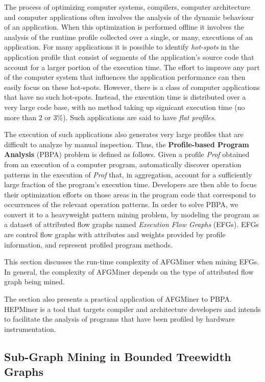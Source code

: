 The process of optimizing computer systems, compilers, computer architecture and computer applications often involves the analysis of the dynamic behaviour of an application. When this optimization is performed offline it involves the analysis of the runtime profile collected over a single, or many, executions of an application. For many applications it is possible to identify {\em hot-spots} in the application profile that consist of segments of the application's source code that account for a larger portion of the execution time. The effort to improve any part of the computer system that influences the application performance can then easily focus on these hot-spots. However, there is a class of computer applications that have no such hot-spots. Instead, the execution time is distributed over a very large code base, with no method taking up signicant execution time (\ie no more than 2 or 3\%). Such applications are said to have \emph{flat profiles}.

The execution of such applications also generates very large profiles that are difficult to analyze by manual inspection. Thus, the {\bf Profile-based Program Analysis} (PBPA) problem is defined as follows. Given a profile {\em Prof} obtained from an execution of a computer program, automatically discover operation patterns in the execution of {\em Prof} that, in aggregation, account for a sufficiently large fraction of the program's execution time. Developers are then able to focus their optimization efforts on those areas in the program code that correspond to occurrences of the relevant operation patterns. In order to solve PBPA, we convert it to a heavyweight pattern mining problem, by modeling the program as a dataset of attributed flow graphs named \emph{Execution Flow Graphs} (EFGs). EFGs are control flow graphs with attributes and weights provided by profile information, and represent profiled program methods.

This section discusses the run-time complexity of AFGMiner when mining EFGs. In general, the complexity of AFGMiner depends on the type of attributed flow graph being mined.

The section also presents a practical application of AFGMiner to PBPA. HEPMiner is a tool that targets compiler and architecture developers and intends to facilitate the analysis of programs that have been profiled by hardware instrumentation\cite{Nagpurkar-caecw07}. 

\subsection{Sub-Graph Mining in Bounded Treewidth Graphs}

